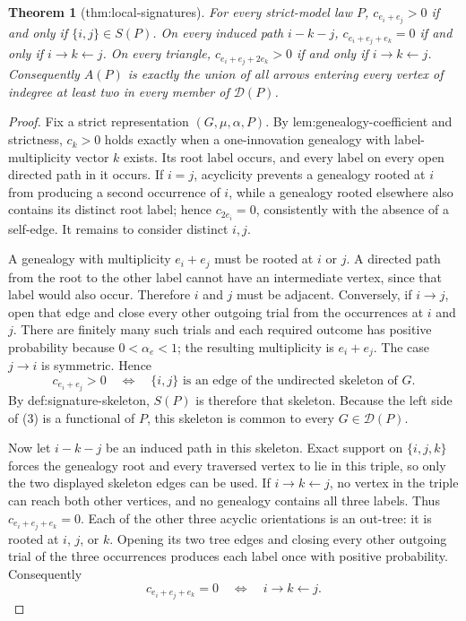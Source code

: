 \documentclass{article}
\newtheorem{theorem}{Theorem}
\begin{document}
\begin{theorem}[thm:local-signatures]\label{thm:local-signatures}
For every strict-model law \(P\), \(c_{e_i+e_j}>0\) if and only if \(\{i,j\}\in S(P)\). On every induced path \(i-k-j\), \(c_{e_i+e_j+e_k}=0\) if and only if \(i\to k\leftarrow j\). On every triangle, \(c_{e_i+e_j+2e_k}>0\) if and only if \(i\to k\leftarrow j\). Consequently \(A(P)\) is exactly the union of all arrows entering every vertex of indegree at least two in every member of \(\mathcal D(P)\).
\end{theorem}
\begin{proof}
Fix a strict representation \((G,\mu,\alpha,P)\).  By lem:genealogy-coefficient and strictness, \(c_k>0\) holds exactly when a one-innovation genealogy with label-multiplicity vector \(k\) exists.  Its root label occurs, and every label on every open directed path in it occurs.  If \(i=j\), acyclicity prevents a genealogy rooted at \(i\) from producing a second occurrence of \(i\), while a genealogy rooted elsewhere also contains its distinct root label; hence \(c_{2e_i}=0\), consistently with the absence of a self-edge.  It remains to consider distinct \(i,j\).

A genealogy with multiplicity \(e_i+e_j\) must be rooted at \(i\) or \(j\).  A directed path from the root to the other label cannot have an intermediate vertex, since that label would also occur.  Therefore \(i\) and \(j\) must be adjacent.  Conversely, if \(i\to j\), open that edge and close every other outgoing trial from the occurrences at \(i\) and \(j\).  There are finitely many such trials and each required outcome has positive probability because \(0<\alpha_e<1\); the resulting multiplicity is \(e_i+e_j\).  The case \(j\to i\) is symmetric.  Hence
\[
 c_{e_i+e_j}>0
 \quad\Longleftrightarrow\quad
 \{i,j\}\text{ is an edge of the undirected skeleton of }G.
\tag{3}
\]
By def:signature-skeleton, \(S(P)\) is therefore that skeleton.  Because the left side of (3) is a functional of \(P\), this skeleton is common to every \(G\in\mathcal D(P)\).

Now let \(i-k-j\) be an induced path in this skeleton.  Exact support on \(\{i,j,k\}\) forces the genealogy root and every traversed vertex to lie in this triple, so only the two displayed skeleton edges can be used.  If \(i\to k\leftarrow j\), no vertex in the triple can reach both other vertices, and no genealogy contains all three labels.  Thus \(c_{e_i+e_j+e_k}=0\).  Each of the other three acyclic orientations is an out-tree: it is rooted at \(i\), \(j\), or \(k\).  Opening its two tree edges and closing every other outgoing trial of the three occurrences produces each label once with positive probability.  Consequently
\[
 c_{e_i+e_j+e_k}=0
 \quad\Longleftrightarrow\quad
 i\to k\leftarrow j.
\tag{4}
\]


\end{proof}
\end{document}

